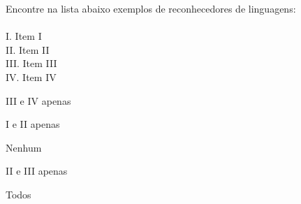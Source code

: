 \question[10]
Encontre na lista abaixo exemplos de reconhecedores de linguagens:\\
\\
I. Item I\\
II. Item II\\
III. Item III\\
IV. Item IV
\\
\begin{choices}
\item III e IV apenas
\item I e II apenas
\item Nenhum %
\item II e III apenas
\item Todos
\end{choices}
\answerline
